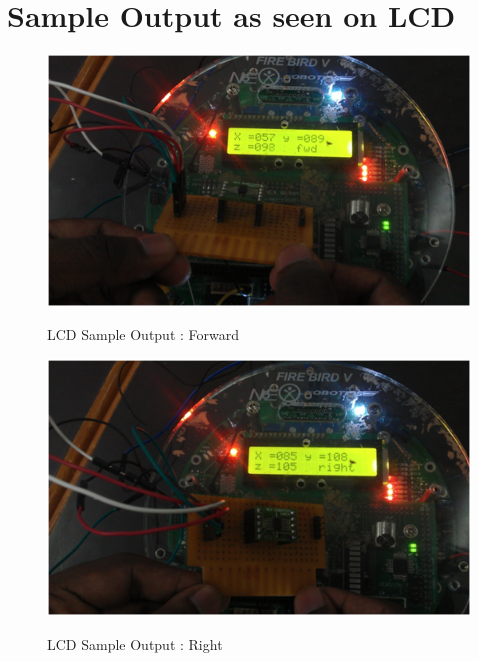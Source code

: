 \documentclass[a4paper,12 pt]{article}
\begin{document}
\pagebreak
\section{Sample Output as seen on LCD}

\begin{figure}[!h]
\begin{center}
\includegraphics[]{acco1.png}
\label{fig:7}
\vspace{7mm}
\caption{LCD Sample Output : Forward}
\includegraphics[]{acco2.png}
\label{fig:8}
\caption{LCD Sample Output : Right}
\end{center}
\end{figure}

\pagebreak
\end{document}
